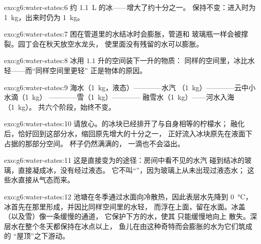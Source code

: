 \begin{solution}{exo:g6:water-states:6}
约 \qty{1.1}{L} 的冰——增大了约十分之一。
保持不变：进入时为 \qty{1}{kg}，出来时仍为 \qty{1}{kg}。
\end{solution}

\begin{solution}{exo:g6:water-states:7}
困在管道里的水结冰时会膨胀，管道和
玻璃瓶一样会被撑裂。园丁会在秋天放空水龙头，
使里面没有残留的水可以膨胀。
\end{solution}

\begin{solution}{exo:g6:water-states:8}
冰用 $1.1$ 升的空间装下一升的物质：
同样的空间里，冰比水轻——而“同样空间里更轻”
正是物体的原因。
\end{solution}

\begin{solution}{exo:g6:water-states:9}
海水（\qty{1}{kg}，液态）————水汽
（\qty{1}{kg}）————云中小水滴（\qty{1}{kg}）
————雪（\qty{1}{kg}）————
融雪水（\qty{1}{kg}）——河水入海（\qty{1}{kg}）。
共六个阶段，始终不变。
\end{solution}

\begin{solution}{exo:g6:water-states:10}
请放心。的冰块已经排开了与自身\emph{}相等的柠檬水；
融化后，恰好回到这部分水，缩回原先增大的十分之一，
正好流入冰块原先在液面下占据的那部分空间。
杯子仍然满满的，
一滴也不会溢出。
\end{solution}

\begin{solution}{exo:g6:water-states:11}
这是直接变为的途径：房间中看不见的水汽
碰到结冰的玻璃，直接凝成冰，没有经过液态。
它不叫“”，因为玻璃上从未出现过液态水；
这些水直接从气态而来。
\end{solution}

\begin{solution}{exo:g6:water-states:12}
池塘在冬季通过水面向冷散热，因此表层水先降到 \qty{0}{\celsius}，
冰首先在那里形成，并因比同样空间里的水轻，
而浮在上面，留在水面。冰盖（以及雪）像一条缓慢的通道，
它保护下方的水，使其
只能缓慢地向上
散失。深层水在整个冬天都保持在冰点以上，
鱼儿在由这种奇特而会膨胀的水为它们筑成的
“屋顶”之下游动。
\end{solution}

